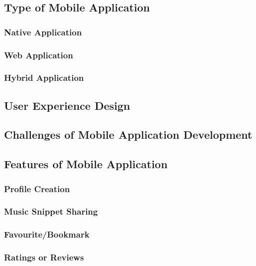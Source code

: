 \subsection{Type of Mobile Application}

\subsubsection{Native Application}

\subsubsection{Web Application}

\subsubsection{Hybrid Application}

\subsection{User Experience Design}

\subsection{Challenges of Mobile Application Development}

\subsection{Features of Mobile Application}

\subsubsection{Profile Creation}

\subsubsection{Music Snippet Sharing}

\subsubsection{Favourite/Bookmark}

\subsubsection{Ratings or Reviews}


